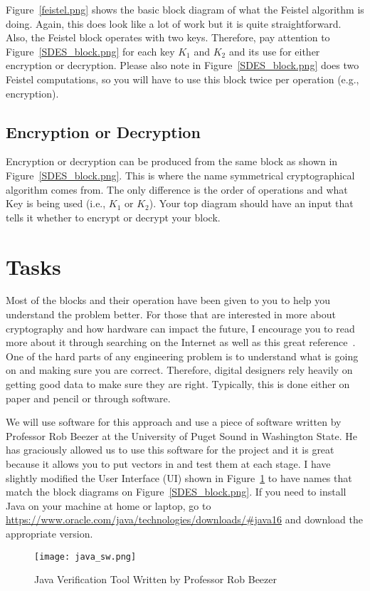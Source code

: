 \documentclass{article}
\begin{document}
Figure~\ref{feistel.png} shows the basic block diagram of what the
Feistel algorithm is doing.  
Again, this does look like a lot of work but it is quite
straightforward.
Also, the Feistel block operates with two keys.
Therefore, pay attention to Figure~\ref{SDES_block.png} for each key
$K_1$ and $K_2$ and its use for either encryption or decryption.
Please also note in Figure~\ref{SDES_block.png} does two Feistel
computations, so you will have to use this block twice per operation
(e.g., encryption).

\subsection{Encryption or Decryption}

Encryption or decryption can be produced from the same block as shown in
Figure~\ref{SDES_block.png}.  This is where the name symmetrical
cryptographical algorithm comes from.  The only difference is the
order of operations and what Key is being
used (i.e., $K_1$ or $K_2$).  Your top diagram should have an input
that tells it whether to
encrypt or decrypt your block.
  
\section{Tasks}

Most of the blocks and their operation
have been given to you to help you understand the
problem better.
For those that are interested in more about cryptography and how
hardware can impact the future, I encourage you to read more about it
through searching on the Internet as well as this great
reference~\cite{10.5555/1721909}.
One of the hard parts of any engineering problem is
to understand what is going on and making sure you are correct.
Therefore, digital designers rely heavily on getting good data to make
sure they are right.  Typically, this is done either on paper and
pencil or through software.

We will use software for this approach
and use a piece of software written by Professor Rob Beezer at the
University of Puget Sound in Washington State.  He has graciously
allowed us to use this software for the project and it is great
because it allows you to put vectors in and test them at each stage.
I have slightly modified the User Interface (UI) shown in
Figure~\ref{java_sw.png} to have names that
match the block diagrams on Figure~\ref{SDES_block.png}.  If you need
to install Java on your machine at home or laptop, go to
\url{https://www.oracle.com/java/technologies/downloads/#java16} and
download the appropriate version.
\begin{figure} [t!]
  \centering
  \texttt{[image: java\_sw.png]}
  \caption{Java Verification Tool Written by Professor Rob Beezer}
  \label{java_sw.png}
\end{figure}
\end{document}
